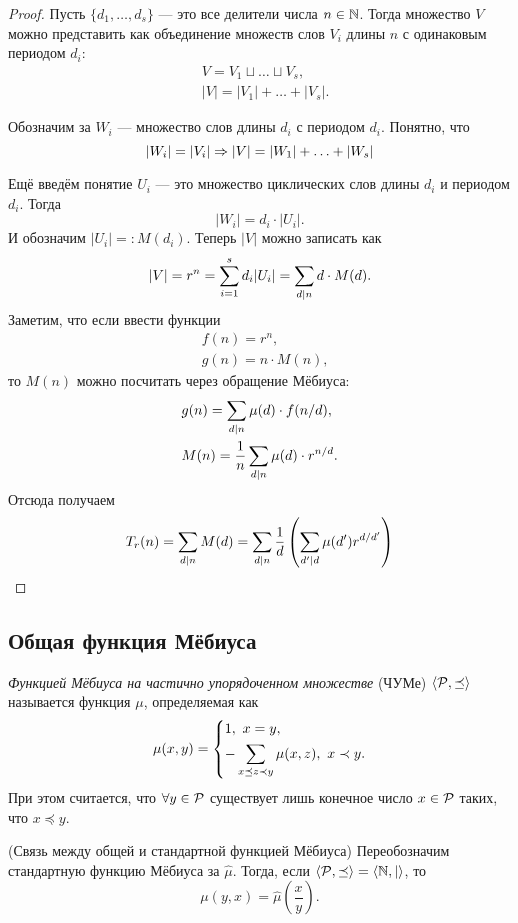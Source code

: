 \begin{proof}
	Пусть $\{d_1, \ldots, d_s\}$ --- это все делители числа $n \in \mathbb{N}$. Тогда множество $V$ можно представить как объединение множеств слов $V_i$ длины $n$ с одинаковым периодом $d_i$:
	\begin{align*}
		&V = V_1 \sqcup \ldots \sqcup V_s,
		\\
		&|V| = |V_1| + \ldots + |V_s|.
	\end{align*}
	
	Обозначим за $W_i$ --- множество слов длины $d_i$ с периодом $d_i$. Понятно, что
	\[
		|W_i| = |V_i| \Rightarrow |V| = |W_1| + \ldots + |W_s|
	\]
	
	Ещё введём понятие $U_i$ --- это множество циклических слов длины $d_i$ и периодом $d_i$. Тогда
	\[
		|W_i| = d_i \cdot |U_i|.
	\]
	И обозначим $|U_i| =: M(d_i)$. Теперь $|V|$ можно записать как
	\[
		|V| = r^n = \sum\limits_{i = 1}^s d_i |U_i| = \sum\limits_{d \mid n} d \cdot M(d).
	\]
	Заметим, что если ввести функции
	\begin{align*}
		&f(n) = r^n,
		\\
		&g(n) = n \cdot M(n),
	\end{align*}
	то $M(n)$ можно посчитать через обращение Мёбиуса:
	\begin{align*}
		&g(n) = \sum\limits_{d \mid n} \mu(d) \cdot f(n / d),
		\\
		&M(n) = \frac{1}{n}\sum\limits_{d \mid n} \mu(d) \cdot r^{n / d}.
	\end{align*}
	Отсюда получаем
	\[
		T_r(n) = \sum\limits_{d \mid n} M(d) = \sum\limits_{d \mid n} \frac{1}{d} \left(\sum\limits_{d' \mid d} \mu(d') r^{d / d'}\right)
	\]
\end{proof}

\subsection{Общая функция Мёбиуса}

\begin{definition}
	 \textit{Функцией Мёбиуса на частично упорядоченном множестве} (ЧУМе) $\langle\mathcal{P}, \preceq\rangle$ называется функция $\mu$, определяемая как
	 \[
	 	\mu(x, y) = \left\{\begin{aligned}
	 		&{1,\ x = y,}
	 		\\
	 		&{-\sum\limits_{x \preceq z \prec y} \mu(x, z),\ x \prec y.}
 		\end{aligned}\right.
	 \]
	 При этом считается, что $\forall y \in \mathcal{P}$ существует лишь конечное число $x \in \mathcal{P}$ таких, что $x \preceq y$.
\end{definition}

\begin{theorem} (Связь между общей и стандартной функцией Мёбиуса)
	Переобозначим стандартную функцию Мёбиуса за $\hat{\mu}$. Тогда, если $\langle\mathcal{P}, \preceq\rangle = \langle\mathbb{N}, |\rangle$, то
	\[
		\mu(y, x) = \hat{\mu}\left(\frac{x}{y}\right).
	\]
\end{theorem}

